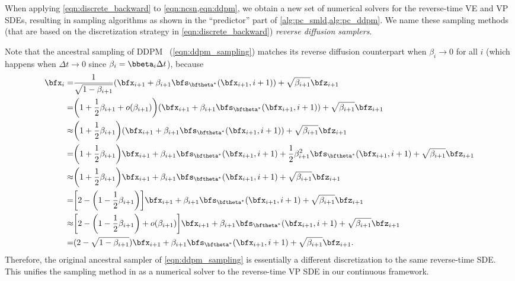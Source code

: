When applying \cref{eqn:discrete_backward} to \cref{eqn:ncsn,eqn:ddpm}, we obtain a new set of numerical solvers for the reverse-time VE and VP SDEs, resulting in sampling algorithms as shown in the ``predictor'' part of \cref{alg:pc_smld,alg:pc_ddpm}. We name these sampling methods (that are based on the discretization strategy in \cref{eqn:discrete_backward}) \emph{reverse diffusion samplers}. 

Note that the ancestral sampling of DDPM~\citep{ho2020denoising} (\cref{eqn:ddpm_sampling}) matches its reverse diffusion counterpart when $\beta_i \to 0$ for all $i$ (which happens when $\Delta t \to 0$ since $\beta_i = \bbeta_i \Delta t$), because
\begin{align*}
    \bfx_i = &\frac{1}{\sqrt{1-\beta_{i+1}}}(\bfx_{i+1} + \beta_{i+1} \bfs_{\bftheta^*}(\bfx_{i+1}, i+1)) + \sqrt{\beta_{i+1}} \bfz_{i+1}\\
    =&  \bigg( 1 + \frac{1}{2}\beta_{i+1} + o(\beta_{i+1}) \bigg)(\bfx_{i+1} + \beta_{i+1} \bfs_{\bftheta^*}(\bfx_{i+1}, i+1)) + \sqrt{\beta_{i+1}} \bfz_{i+1}\\
    \approx & \bigg( 1 + \frac{1}{2}\beta_{i+1} \bigg)(\bfx_{i+1} + \beta_{i+1} \bfs_{\bftheta^*}(\bfx_{i+1}, i+1)) + \sqrt{\beta_{i+1}} \bfz_{i+1}\\
    =&\bigg(1 + \frac{1}{2}\beta_{i+1} \bigg) \bfx_{i+1} + \beta_{i+1}\bfs_{\bftheta^*}(\bfx_{i+1}, i+1) + \frac{1}{2}\beta_{i+1}^2 \bfs_{\bftheta^*}(\bfx_{i+1}, i+1) + \sqrt{\beta_{i+1}} \bfz_{i+1}\\
    \approx& \bigg(1 + \frac{1}{2}\beta_{i+1} \bigg) \bfx_{i+1} + \beta_{i+1}\bfs_{\bftheta^*}(\bfx_{i+1}, i+1) + \sqrt{\beta_{i+1}} \bfz_{i+1}\\
    =& \bigg[2 - \bigg(1 - \frac{1}{2}\beta_{i+1}\bigg) \bigg] \bfx_{i+1} + \beta_{i+1}\bfs_{\bftheta^*}(\bfx_{i+1}, i+1) + \sqrt{\beta_{i+1}} \bfz_{i+1}\\
    \approx& \bigg[2 - \bigg(1 - \frac{1}{2}\beta_{i+1}\bigg) + o(\beta_{i+1}) \bigg] \bfx_{i+1} + \beta_{i+1}\bfs_{\bftheta^*}(\bfx_{i+1}, i+1) + \sqrt{\beta_{i+1}} \bfz_{i+1}\\
    =& (2 - \sqrt{1-\beta_{i+1}})\bfx_{i+1} + \beta_{i+1}\bfs_{\bftheta^*}(\bfx_{i+1}, i+1)+ \sqrt{\beta_{i+1}} \bfz_{i+1}.
\end{align*}
Therefore, the original ancestral sampler of \cref{eqn:ddpm_sampling} is essentially a different discretization to the same reverse-time SDE. This unifies the sampling method in \citet{ho2020denoising} as a numerical solver to the reverse-time VP SDE in our continuous framework. %


